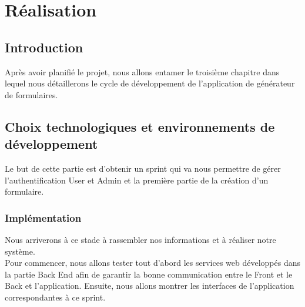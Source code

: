 \chapter{Réalisation}

\section{Introduction}
 
Après avoir planifié le projet, nous allons entamer le troisième chapitre dans lequel nous détaillerons le cycle de développement de l'application de générateur de formulaires.

\section{Choix technologiques  et  environnements de développement}
Le but de cette partie est d’obtenir un sprint qui va nous permettre de gérer l'authentification User et Admin et la première partie de la création d'un formulaire.
\subsection{Implémentation}
Nous arriverons à ce stade à rassembler nos informations et à réaliser notre système.\\
Pour commencer, nous allons tester tout d’abord les services web développés dans la partie Back End afin de garantir
la bonne communication entre le Front et le Back et l’application. Ensuite, nous allons montrer les interfaces de l’application correspondantes à ce sprint.

    \newpage
